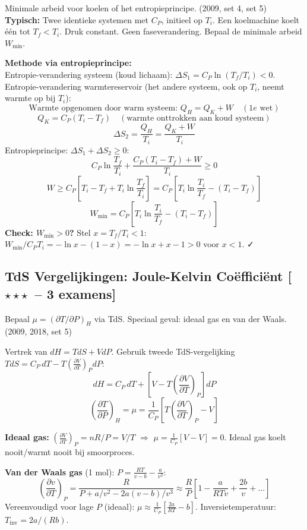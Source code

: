 \documentclass[10pt,a4paper]{article}
\newcommand{\pder}[2]{\left(\frac{\partial #1}{\partial #2}\right)}
\begin{document}
\begin{oefening}{Minimale arbeid voor koelen of het entropieprincipe. \textnormal{(2009, set 4, set 5)}}
\textbf{Typisch:} Twee identieke systemen met $C_P$, initieel op $T_i$. Een koelmachine koelt één tot $T_f < T_i$. Druk constant. Geen faseverandering. Bepaal de minimale arbeid $W_\text{min}$.
\end{oefening}

\begin{oplossing}
\textbf{Methode via entropieprincipe:}\\
Entropie-verandering systeem (koud lichaam): $\Delta S_1 = C_P\ln(T_f/T_i) < 0$.\\
Entropie-verandering warmtereservoir (het andere systeem, ook op $T_i$, neemt warmte op bij $T_i$):
$$\text{Warmte opgenomen door warm systeem: } Q_H = Q_K + W \quad (1e \text{ wet})$$
$$Q_K = C_P(T_i - T_f) \quad (\text{warmte onttrokken aan koud systeem})$$
$$\Delta S_2 = \frac{Q_H}{T_i} = \frac{Q_K + W}{T_i}$$
Entropieprincipe: $\Delta S_1 + \Delta S_2 \geq 0$:
$$C_P\ln\frac{T_f}{T_i} + \frac{C_P(T_i-T_f) + W}{T_i} \geq 0$$
$$W \geq C_P\left[T_i - T_f + T_i\ln\frac{T_f}{T_i}\right] = C_P\left[T_i\ln\frac{T_i}{T_f} - (T_i-T_f)\right]$$
$$\boxed{W_\text{min} = C_P\left[T_i\ln\frac{T_i}{T_f} - (T_i - T_f)\right]}$$
\textbf{Check: $W_\text{min} > 0$?} Stel $x = T_f/T_i < 1$: $W_\text{min}/C_PT_i = -\ln x - (1-x) = -\ln x + x - 1 > 0$ voor $x<1$. ✓
\end{oplossing}

\subsection{TdS Vergelijkingen: Joule-Kelvin Coëfficiënt \textnormal{\color{warningred}[$\star\star\star$\ -- 3 examens]}}

\begin{oefening}{Bepaal $\mu = (\partial T/\partial P)_H$ via TdS. Speciaal geval: ideaal gas en van der Waals. \textnormal{(2009, 2018, set 5)}}
\end{oefening}

\begin{oplossing}
Vertrek van $dH = TdS + VdP$. Gebruik tweede TdS-vergelijking $TdS = C_P\,dT - T\pder{V}{T}_P dP$:
$$dH = C_P\,dT + \left[V - T\pder{V}{T}_P\right]dP$$
$$\pder{T}{P}_H = \mu = \frac{1}{C_P}\left[T\pder{V}{T}_P - V\right]$$

\textbf{Ideaal gas:} $\pder{V}{T}_P = nR/P = V/T$ $\Rightarrow$ $\mu = \frac{1}{C_P}\left[V - V\right] = 0$. Ideaal gas koelt nooit/warmt nooit bij smoorproces.

\textbf{Van der Waals gas} (1 mol): $P = \frac{RT}{v-b} - \frac{a}{v^2}$:
$$\pder{v}{T}_P = \frac{R}{P + a/v^2 - 2a(v-b)/v^3} \approx \frac{R}{P}\left[1 - \frac{a}{RTv} + \frac{2b}{v} + ...\right]$$
Vereenvoudigd voor lage $P$ (ideaal): $\mu \approx \frac{1}{C_P}\left[\frac{2a}{RT} - b\right]$. 
Inversietemperatuur: $T_\text{inv} = 2a/(Rb)$.
\end{oplossing}
\end{document}
